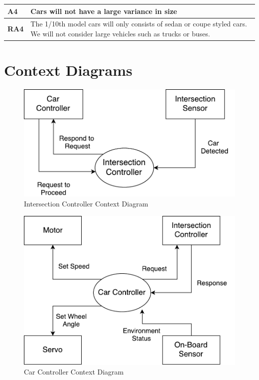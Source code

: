 \documentclass [11pt]{article}
\begin{document}
\begin{longtable}{| p{ } | p{ } | }\hline 
\textbf{A4} & \textbf{Cars will not have a large variance in size} \\ \hline
\textbf{RA4} &  The 1/10th model cars will only consists of sedan or coupe styled cars. We will not consider large vehicles such as trucks or buses.\\ \hline
\end{longtable}


\section{Context Diagrams}
\begin{figure} [h!]
	\centering
	\includegraphics [scale = 0.7] {figures/IC_ContextDiagram.pdf}
	\caption{Intersection Controller Context Diagram}
\end{figure}
\begin{figure} [h!]
	\centering
	\includegraphics [scale =0.7] {figures/CarCtrl_ContextDiag.pdf}
	\caption{Car Controller Context Diagram}
\end{figure}
\end{document}
